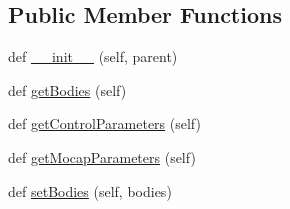 \subsection*{Public Member Functions}
\begin{DoxyCompactItemize}
\item 
def \mbox{\hyperlink{classwindshape_1_1gui_1_1widgets_1_1tabs_1_1_settings_widget_1_1_settings_widget_a0072289cd63dc53d6569b333d770ec49}{\+\_\+\+\_\+init\+\_\+\+\_\+}} (self, parent)
\item 
def \mbox{\hyperlink{classwindshape_1_1gui_1_1widgets_1_1tabs_1_1_settings_widget_1_1_settings_widget_a8173097480e750a9fdd9a8d154f529ac}{get\+Bodies}} (self)
\item 
def \mbox{\hyperlink{classwindshape_1_1gui_1_1widgets_1_1tabs_1_1_settings_widget_1_1_settings_widget_adf598410924d845e4f82ac5b56db2e80}{get\+Control\+Parameters}} (self)
\item 
def \mbox{\hyperlink{classwindshape_1_1gui_1_1widgets_1_1tabs_1_1_settings_widget_1_1_settings_widget_a265d75b327d9f13799ec38614749e130}{get\+Mocap\+Parameters}} (self)
\item 
def \mbox{\hyperlink{classwindshape_1_1gui_1_1widgets_1_1tabs_1_1_settings_widget_1_1_settings_widget_a0527a153ceea0b6fdd5e52a9324ff812}{set\+Bodies}} (self, bodies)
\end{DoxyCompactItemize}
